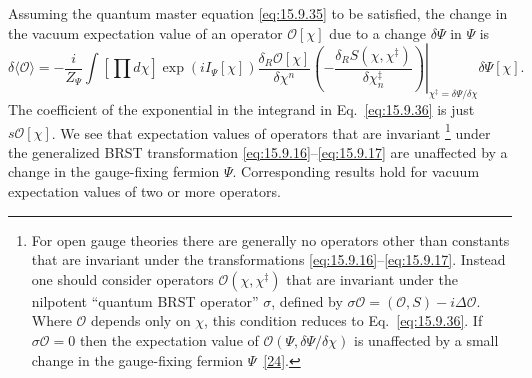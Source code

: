 Assuming the quantum master equation \eqref{eq:15.9.35} to be satisfied, the
change in the vacuum expectation value of an operator $\mathcal O[\chi]$ due
to a change $\delta\Psi$ in $\Psi$ is
\begin{equation}
\delta\langle\mathcal O\rangle
=-\frac{i}{Z_\Psi}\int\left[\prod d\chi\right]
\exp(iI_\Psi[\chi])
\frac{\delta_R\mathcal O[\chi]}{\delta\chi^n}
\left.
\left(-\frac{\delta_R S(\chi,\chi^{\ddagger})}
{\delta\chi_n^{\ddagger}}\right)
\right|_{\chi^{\ddagger}=\delta\Psi/\delta\chi}
\delta\Psi[\chi].
\tag{15.9.36}\label{eq:15.9.36}
\end{equation}
The coefficient of the exponential in the integrand in Eq.~\eqref{eq:15.9.36}
is just $s\mathcal O[\chi]$. We see that expectation values of operators that
are invariant
\footnote{For open gauge theories there are generally no operators other than
constants that are invariant under the transformations
\eqref{eq:15.9.16}--\eqref{eq:15.9.17}. Instead one should consider operators
$\mathcal O(\chi,\chi^{\ddagger})$ that are invariant under the nilpotent
``quantum BRST operator'' $\sigma$, defined by
$\sigma\mathcal O=(\mathcal O,S)-i\Delta\mathcal O$. Where $\mathcal O$ depends
only on $\chi$, this condition reduces to Eq.~\eqref{eq:15.9.36}. If
$\sigma\mathcal O=0$ then the expectation value of
$\mathcal O(\Psi,\delta\Psi/\delta\chi)$ is unaffected by a small change in
the gauge-fixing fermion $\Psi$~\hyperref[ch15-ref-24]{[24]}.}
under the generalized BRST transformation
\eqref{eq:15.9.16}--\eqref{eq:15.9.17} are unaffected by a change in the
gauge-fixing fermion $\Psi$. Corresponding results hold for vacuum expectation
values of two or more operators.
